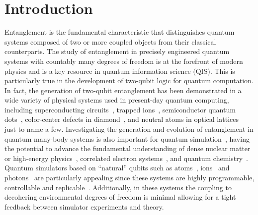 \documentclass[twocolumn,superscriptaddress,unsortedaddress,
 amsmath,amssymb,
 aps,
]{revtex4-2}
\begin{document}
\section{Introduction} %
Entanglement is the fundamental characteristic that distinguishes
quantum systems composed of two or more coupled objects from their classical counterparts. The study of entanglement in precisely engineered quantum systems with countably many degrees of freedom is at the forefront of modern physics and is a key resource in quantum information science (QIS). This is particularly true in the development of two-qubit logic for quantum computation. In fact, the generation of two-qubit entanglement has been demonstrated in a wide variety of physical systems used in present-day quantum computing, including superconducting circuits~\cite{Steffen1423,Barends2014}, trapped ions~\cite{Monroe1995,Schmidt-Kaler2003}, semiconductor quantum dots~\cite{Li809,Petta2005}, color-center defects in diamond~\cite{Dutt2007,Neumann2010,Bernien2013}, and neutral atoms in optical lattices~\cite{Levine2019,Madjarov2020} just to name a few. Investigating the generation and evolution of entanglement in quantum many-body systems is also important for quantum simulation~\cite{feynman1982simulating,Trabesinger2012,Georgescu2014,Altman2021}, having the potential to advance the fundamental understanding of dense nuclear matter or high-energy physics~\cite{Carlson2018,Klco2020,Yamamoto2022,Illa2022,Bauer2022}, correlated electron systems~\cite{Smith2016,Hofstetter2018,Smith2019}, and quantum chemistry~\cite{Peruzzo2014,Reiher2016,Kandala2017}. Quantum simulators based on ``natural'' qubits such as atoms~\cite{Greiner2002,Hart2015,Ebadi2021}, ions~\cite{Lanyon2011,Monroe2021} and photons~\cite{Aspuru-Guzik2012} are particularly appealing since these systems are highly programmable, controllable and replicable~\cite{Alsing2023}. Additionally, in these systems the coupling to decohering environmental degrees of freedom is minimal allowing for a tight feedback between simulator experiments and theory.
\end{document}

